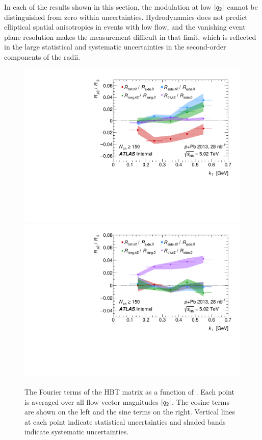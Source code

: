 In each of the results shown in this section, the modulation at low $|q_{2}|$ cannot be distinguished from zero within uncertainties.
Hydrodynamics does not predict elliptical spatial anisotropies in events with low flow, and the vanishing event plane resolution makes the measurement difficult in that limit, which is reflected in the large statistical and systematic uncertainties in the second-order components of the radii.


\begin{figure}[t]
\centering
\includegraphics[width=.49\linewidth]{can_u_Rosl_vs_kt.pdf}
\includegraphics[width=.49\linewidth]{can_w_Rosl_vs_kt.pdf}\\
\caption{The Fourier terms of the HBT matrix as a function of \kt. Each point is averaged over all flow vector magnitudes $|q_{2}|$. The cosine terms are shown on the left and the sine terms on the right. Vertical lines at each point indicate statistical uncertainties and shaded bands indicate systematic uncertainties.}
\label{fig:uw_vs_kt}
\end{figure}

